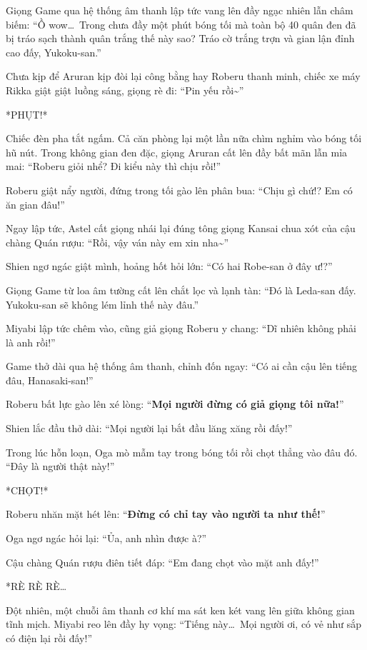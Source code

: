 \documentclass[../main.tex]{subfiles}
\begin{document}
Giọng Game qua hệ thống âm thanh lập tức vang lên đầy ngạc nhiên lẫn châm biếm: ``Ồ wow\dots\ Trong chưa đầy một phút bóng tối mà toàn bộ 40 quân đen đã bị tráo sạch thành quân trắng thế này sao? Tráo cờ trắng trợn và gian lận đỉnh cao đấy, Yukoku-san.''

Chưa kịp để Aruran kịp đòi lại công bằng hay Roberu thanh minh, chiếc xe máy Rikka giật giật luồng sáng, giọng rè đi: ``Pin yếu rồi\~{}''

*PHỤT!*

Chiếc đèn pha tắt ngấm. Cả căn phòng lại một lần nữa chìm nghỉm vào bóng tối hũ nút. Trong không gian đen đặc, giọng Aruran cất lên đầy bất mãn lẫn mỉa mai: ``Roberu giỏi nhể? Đi kiểu này thì chịu rồi!''

Roberu giật nẩy người, đứng trong tối gào lên phân bua: ``Chịu gì chứ!? Em có ăn gian đâu!''

Ngay lập tức, Astel cất giọng nhái lại đúng tông giọng Kansai chua xót của cậu chàng Quán rượu: ``Rồi, vậy ván này em xin nha\~{}''

Shien ngơ ngác giật mình, hoảng hốt hỏi lớn: ``Có hai Robe-san ở đây ư!?''

Giọng Game từ loa âm tường cất lên chắt lọc và lạnh tàn: ``Đó là Leda-san đấy. Yukoku-san sẽ không lém lỉnh thế này đâu.''

Miyabi lập tức chêm vào, cũng giả giọng Roberu y chang: ``Dĩ nhiên không phải là anh rồi!''

Game thở dài qua hệ thống âm thanh, chỉnh đốn ngay: ``Có ai cần cậu lên tiếng đâu, Hanasaki-san!''

Roberu bất lực gào lên xé lòng: ``\textbf{Mọi người đừng có giả giọng tôi nữa!}''

Shien lắc đầu thở dài: ``Mọi người lại bắt đầu lăng xăng rồi đấy!''

Trong lúc hỗn loạn, Oga mò mẫm tay trong bóng tối rồi chọt thẳng vào đâu đó. ``Đây là người thật này!''

*CHỌT!*

Roberu nhăn mặt hét lên: ``\textbf{Đừng có chỉ tay vào người ta như thế!}''

Oga ngơ ngác hỏi lại: ``Ủa, anh nhìn được à?''

Cậu chàng Quán rượu điên tiết đáp: ``Em đang chọt vào mặt anh đấy!''

*RÈ RÈ RÈ\dots*

Đột nhiên, một chuỗi âm thanh cơ khí ma sát ken két vang lên giữa không gian tĩnh mịch. Miyabi reo lên đầy hy vọng: ``Tiếng này\dots\ Mọi người ơi, có vẻ như sắp có điện lại rồi đấy!''
\end{document}
